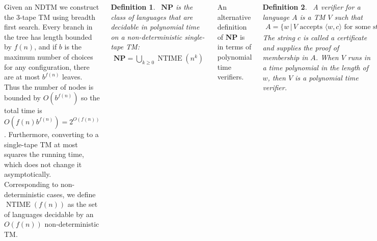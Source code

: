 \documentclass{tikzposter} %
\DeclareMathOperator{\NTIME}{NTIME}
\newtheorem{theorem}{Theorem}
\newtheorem{definition}{Definition}
\begin{document}
\begin{columns}
{{        Given an NDTM we construct the 3-tape TM using breadth first search. Every branch in the tree has length bounded by $f(n)$, and if $b$ is the maximum number of choices for any configuration, there are at most $b^{f(n)}$ leaves. Thus the number of nodes is bounded by $O(b^{f(n)})$ so the total time is $O(f(n)b^{f(n)}) = 2^{O(f(n))}$. Furthermore, converting to a single-tape TM at most squares the running time, which does not change it asymptotically. \\

        Corresponding to non-deterministic cases, we define $\NTIME(f(n))$ as the set of languages decidable by an $O(f(n))$ non-deterministic TM. \\

        \begin{definition}
          \ $\mathbf{NP}$ is the class of languages that are decidable in polynomial time on a non-deterministic single-tape TM:
          \begin{align*}
            \mathbf{NP} = \bigcup_{k \ge 0} \NTIME(n^{k})
          \end{align*}
        \end{definition}
        \hphantom{}

        An alternative definition of $\mathbf{NP}$ is in terms of polynomial time verifiers. \\

        \begin{definition}
          \ A verifier for a language $A$ is a TM $V$ such that
          \begin{align*}
            A = \{w \,|\, V \text{ accepts  } \langle w, c\rangle \text{ for some string } c\}
          \end{align*}
          The string $c$ is called a certificate and supplies the proof of membership in $A$. When $V$ runs in a time polynomial in the length of $w$, then $V$ is a polynomial time verifier.
        \end{definition}
        \hphantom{}

        \begin{theorem}
        \ $\mathbf{NP}$ is the class of all languages that have a polynomial time verifier.
        \end{theorem}
        \hphantom{}

        Assume an $O(n^{k})$ time verifier $V$. Given a problem instance $w$, we can non-deterministically guess the certificate $c$ of length at most $n^{k}$ and run $V$ on $\langle w, c \rangle$. \textbf{Finish proof} \\

}}
\end{columns}
\end{document}
